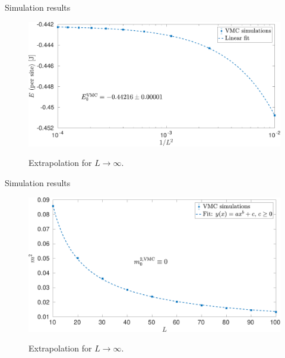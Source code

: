 \documentclass[10pt, compress, protectframetitle, handout]{beamer}
\begin{document}
\begin{frame}{Simulation results}

	\begin{figure}
		\centering
		\includegraphics[width=\textwidth]{E_VMC_log}
		\label{fig:E_VMC_log}
		\caption{Extrapolation for $L \to \infty$.}
	\end{figure}
	
\end{frame}

%
%	

\begin{frame}{Simulation results}

	\begin{figure}
		\centering
		\includegraphics[width=\textwidth]{m2_VMC}
		\label{fig:m2_VMC}
		\caption{Extrapolation for $L \to \infty$.}
	\end{figure}
	
\end{frame}
\end{document}
